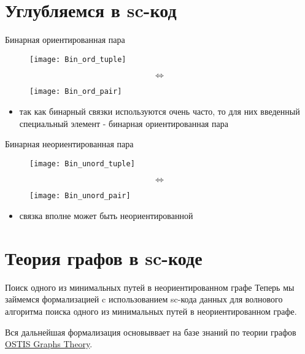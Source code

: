 \documentclass[hyperref={pdftex,unicode}]{beamer}
\newcommand{\objeqv}{
  \begin{center}
    \begin{sideways}
      \[ \Longleftrightarrow \]
    \end{sideways}
  \end{center}
}
\begin{document}
\section{Углубляемся в sc-код}
\begin{frame}{Бинарная ориентированная пара}
  \begin{center}
    \begin{figure}
      \texttt{[image: Bin\_ord\_tuple]}
    \end{figure}

    \objeqv

    \begin{figure}
      \texttt{[image: Bin\_ord\_pair]}
    \end{figure}
  \end{center}

  \begin{itemize}
  \item так как бинарный связки используются очень часто, то для них
    введенный специальный элемент - бинарная ориентированная пара
  \end{itemize}
\end{frame}

\begin{frame}{Бинарная неориентированная пара}
  \begin{center}
    \begin{figure}
      \texttt{[image: Bin\_unord\_tuple]}
    \end{figure}

    \objeqv

    \begin{figure}
      \texttt{[image: Bin\_unord\_pair]}
    \end{figure}
  \end{center}

  \begin{itemize}
  \item связка вполне может быть неориентированной
  \end{itemize}
\end{frame}

\section{Теория графов в sc-коде}
\begin{frame}{Поиск одного из минимальных путей в неориентированном графе}
  Теперь мы займемся формализацией c использованием sc-кода данных для
  волнового алгоритма поиска одного из минимальных путей в
  неориентированном графе.

  Вся дальнейшая формализация основыввает на базе знаний по теории
  графов
  \href{http://ostisgraphstheo.sourceforge.net/index.php/Заглавная_страница}{OSTIS Graphs Theory}.
\end{frame}
\end{document}
